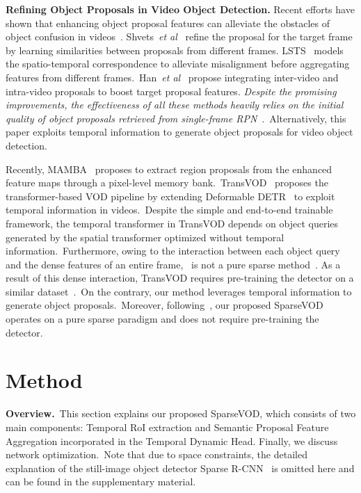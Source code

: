 \documentclass{bmvc2k}
\def\etal{\emph{et al}\bmvaOneDot}
\begin{document}
\vspace{3pt}
\noindent \textbf{Refining Object Proposals in Video Object Detection.}
\label{subsec:object_proposals}
\hspace{0.8pt}
Recent efforts have shown that enhancing object proposal features can alleviate the obstacles of object confusion in videos~\cite{shvets2019leveraging, han2020mining, jiang2020learning}. Shvets~\etal~\cite{shvets2019leveraging} refine the proposal for the target frame by learning similarities between proposals from different frames. LSTS~\cite{jiang2020learning} models the spatio-temporal correspondence to alleviate misalignment before aggregating features from different frames.~Han~\etal~\cite{han2020mining} propose integrating inter-video and intra-video proposals to boost target proposal features. \textit{Despite the promising improvements, the effectiveness of all these methods heavily relies on the initial quality of object proposals retrieved from single-frame RPN}~\cite{ren2015faster}.~Alternatively, this paper exploits temporal information to generate object proposals for video object detection. 

Recently, MAMBA~\cite{sun2021mamba} proposes to extract region proposals from the enhanced feature maps through a pixel-level memory bank.~TransVOD~\cite{he2021end} proposes the transformer-based VOD pipeline by extending Deformable DETR~\cite{zhu2020deformable} to exploit temporal information in videos.~Despite the simple and end-to-end trainable framework, the temporal transformer in TransVOD depends on object queries generated by the spatial transformer optimized without temporal information.~Furthermore, owing to the interaction between each object query and the dense features of an entire frame,~\cite{he2021end} is not a pure sparse method~\cite{sun2021sparse}. As a result of this dense interaction, TransVOD requires pre-training the detector on a similar dataset~\cite{lin2014microsoft}.~On the contrary, our method leverages temporal information to generate object proposals.~Moreover, following~\cite{sun2021sparse}, our proposed SparseVOD operates on a pure sparse paradigm and does not require pre-training the detector.


\vspace{-10pt}
\section{Method}
\label{sec:method}
\textbf{Overview.}~This section explains our proposed SparseVOD, which consists of two main components: Temporal RoI extraction and Semantic Proposal Feature Aggregation incorporated in the Temporal Dynamic Head. Finally, we discuss network optimization.~Note that due to space constraints, the detailed explanation of the still-image object detector Sparse R-CNN~\cite{sun2021sparse} is omitted here and can be found in the supplementary material. 
\end{document}
